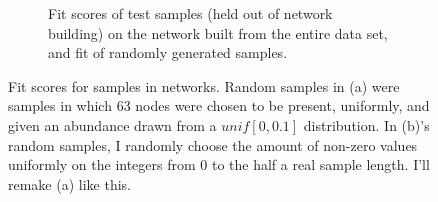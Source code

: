 \documentclass[10pt]{article}
\theoremstyle{definition}
\numberwithin{theorem}{section}
\numberwithin{definition}{section}
\numberwithin{lemma}{section}
\numberwithin{corollary}{section}
\numberwithin{clm}{section}
\numberwithin{rmk}{section}
\begin{document}
\begin{figure}
\begin{subfigure}{\textwidth}
\begin{center}
	\end{center}
\caption{Fit scores of test samples (held out of network building) on the network built from the entire data set, and fit of randomly generated samples.}
\end{subfigure}
\caption{Fit scores for samples in networks. Random samples in (a) were samples in which 63 nodes were chosen to be present, uniformly, and given an abundance drawn from a $unif[0,0.1]$ distribution. In (b)'s random samples, I randomly choose the amount of non-zero values uniformly on the integers from 0 to the half a real sample length. I'll remake (a) like this.}\label{fit_scores}
\end{figure}



\end{document}
